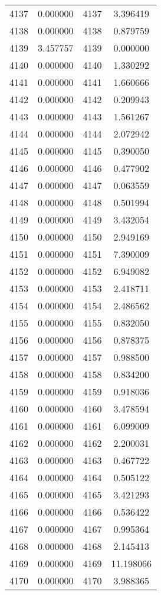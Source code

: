 \documentclass[12pt]{article}
\begin{document}
\begin{longtable}{@{}cccc@{}}
4137 & 0.000000 & 4137 & 3.396419 \\
4138 & 0.000000 & 4138 & 0.879759 \\
4139 & 3.457757 & 4139 & 0.000000 \\
4140 & 0.000000 & 4140 & 1.330292 \\
4141 & 0.000000 & 4141 & 1.660666 \\
4142 & 0.000000 & 4142 & 0.209943 \\
4143 & 0.000000 & 4143 & 1.561267 \\
4144 & 0.000000 & 4144 & 2.072942 \\
4145 & 0.000000 & 4145 & 0.390050 \\
4146 & 0.000000 & 4146 & 0.477902 \\
4147 & 0.000000 & 4147 & 0.063559 \\
4148 & 0.000000 & 4148 & 0.501994 \\
4149 & 0.000000 & 4149 & 3.432054 \\
4150 & 0.000000 & 4150 & 2.949169 \\
4151 & 0.000000 & 4151 & 7.390009 \\
4152 & 0.000000 & 4152 & 6.949082 \\
4153 & 0.000000 & 4153 & 2.418711 \\
4154 & 0.000000 & 4154 & 2.486562 \\
4155 & 0.000000 & 4155 & 0.832050 \\
4156 & 0.000000 & 4156 & 0.878375 \\
4157 & 0.000000 & 4157 & 0.988500 \\
4158 & 0.000000 & 4158 & 0.834200 \\
4159 & 0.000000 & 4159 & 0.918036 \\
4160 & 0.000000 & 4160 & 3.478594 \\
4161 & 0.000000 & 4161 & 6.099009 \\
4162 & 0.000000 & 4162 & 2.200031 \\
4163 & 0.000000 & 4163 & 0.467722 \\
4164 & 0.000000 & 4164 & 0.505122 \\
4165 & 0.000000 & 4165 & 3.421293 \\
4166 & 0.000000 & 4166 & 0.536422 \\
4167 & 0.000000 & 4167 & 0.995364 \\
4168 & 0.000000 & 4168 & 2.145413 \\
4169 & 0.000000 & 4169 & 11.198066 \\
4170 & 0.000000 & 4170 & 3.988365 \\

\end{longtable}
\end{document}

